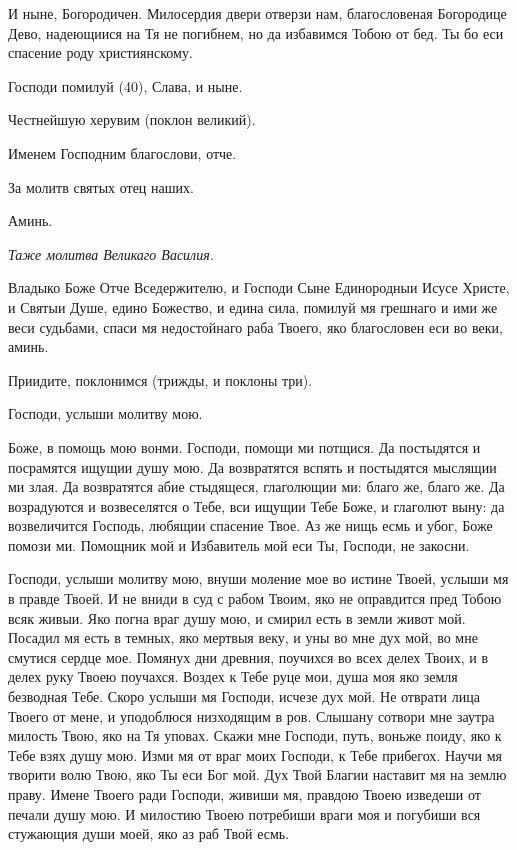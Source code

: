 И ныне, Богородичен. Милосердия двери отверзи нам, благословеная Богородице Дево, надеющиися на Тя не погибнем, но да избавимся Тобою от бед. Ты бо еси спасение роду християнскому.

Господи помилуй (40), Слава, и ныне.

Честнейшую херувим (поклон великий).

Именем Господним благослови, отче.

За молитв святых отец наших.

Аминь.


\itshape Таже молитва Великаго Василия.\normalfont{}


Владыко Боже Отче Вседержителю, и Господи Сыне Единородныи Исусе Христе, и Святыи Душе, едино Божество, и едина сила, помилуй мя грешнаго и ими же веси судьбами, спаси мя недостойнаго раба Твоего, яко благословен еси во веки, аминь.

Приидите, поклонимся (трижды, и поклоны три).




Господи, услыши молитву мою.




Боже, в помощь мою вонми. Господи, помощи ми потщися. Да постыдятся и посрамятся ищущии душу мою. Да возвратятся вспять и постыдятся мыслящии ми злая. Да возвратятся абие стыдящеся, глаголющии ми: благо же, благо же. Да возрадуются и возвеселятся о Тебе, вси ищущии Тебе Боже, и глаголют выну: да возвеличится Господь, любящии спасение Твое. Аз же нищь есмь и убог, Боже помози ми. Помощник мой и Избавитель мой еси Ты, Господи, не закосни.




Господи, услыши молитву мою, внуши моление мое во истине Твоей, услыши мя в правде Твоей. И не вниди в суд с рабом Твоим, яко не оправдится пред Тобою всяк живыи. Яко погна враг душу мою, и смирил есть в земли живот мой. Посадил мя есть в темных, яко мертвыя веку, и уны во мне дух мой, во мне смутися сердце мое. Помянух дни древния, поучихся во всех делех Твоих, и в делех руку Твоею поучахся. Воздех к Тебе руце мои, душа моя яко земля безводная Тебе. Скоро услыши мя Господи, исчезе дух мой. Не отврати лица Твоего от мене, и уподоблюся низходящим в ров. Слышану сотвори мне заутра милость Твою, яко на Тя уповах. Скажи мне Господи, путь, воньже поиду, яко к Тебе взях душу мою. Изми мя от враг моих Господи, к Тебе прибегох. Научи мя творити волю Твою, яко Ты еси Бог мой. Дух Твой Благии наставит мя на землю праву. Имене Твоего ради Господи, живиши мя, правдою Твоею изведеши от печали душу мою. И милостию Твоею потребиши враги моя и погубиши вся стужающия души моей, яко аз раб Твой есмь.

